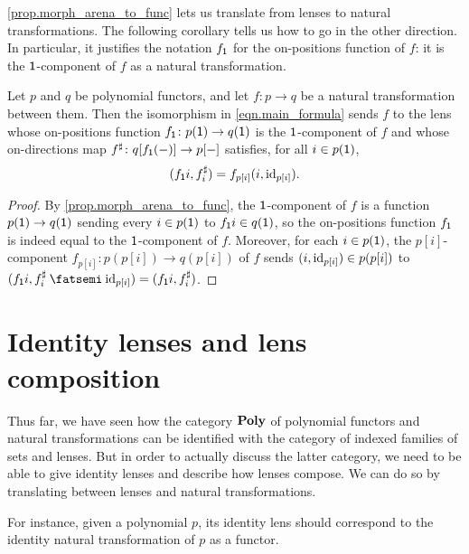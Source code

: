 \documentclass[Book-Poly]{subfiles}
\begin{document}
\cref{prop.morph_arena_to_func} lets us translate from lenses to natural transformations.
The following corollary tells us how to go in the other direction.
In particular, it justifies the notation $f_{\textsf{1}}$ for the on-positions function of $f$: it is the $\textsf{1}$-component of $f$ as a natural transformation.

\begin{corollary} \label{cor.morph_func_to_arena}
Let $p$ and $q$ be polynomial functors, and let $f \colon p \to q$ be a natural transformation between them.
Then the isomorphism in \eqref{eqn.main_formula} sends $f$ to the lens whose on-positions function $f_{\textsf{1}}\colon p(\textsf{1})\to q(\textsf{1})$ is the $\textsf{1}$-component of $f$ and whose on-directions map $f^\sharp\colon q[f_{\textsf{1}}(-)]\to p[-]$ satisfies, for all $i\in p(\textsf{1})$,
\[
    (f_{\textsf{1}}i, f^\sharp_i) = f_{p[i]}(i, \mathrm{id}_{p[i]}).
\]
\end{corollary}
\begin{proof}
By \cref{prop.morph_arena_to_func}, the $\textsf{1}$-component of $f$ is a function $p(\textsf{1})\to q(\textsf{1})$ sending every $i \in p(\textsf{1})$ to $f_{\textsf{1}}i \in q(\textsf{1})$, so the on-positions function $f_{\textsf{1}}$ is indeed equal to the $\textsf{1}$-component of $f$.
Moreover, for each $i\in p(\textsf{1})$, the $p[i]$-component $f_{p[i]} \colon p(p[i]) \to q(p[i])$ of $f$ sends $(i,\mathrm{id}_{p[i]})\in p(p[i])$ to $(f_\1i, f^\sharp_i \then \id_{p[i]}) = (f_\1i, f^\sharp_i)$.
\end{proof}

\section{Identity lenses and lens composition} \label{subsec.poly.cat.morph.id-comp}

Thus far, we have seen how the category $\mathbf{Poly}$ of polynomial functors and natural transformations can be identified with the category of indexed families of sets and lenses.
But in order to actually discuss the latter category, we need to be able to give identity lenses and describe how lenses compose.
We can do so by translating between lenses and natural transformations.

For instance, given a polynomial $p$, its identity lens should correspond to the identity natural transformation of $p$ as a functor.
\end{document}
